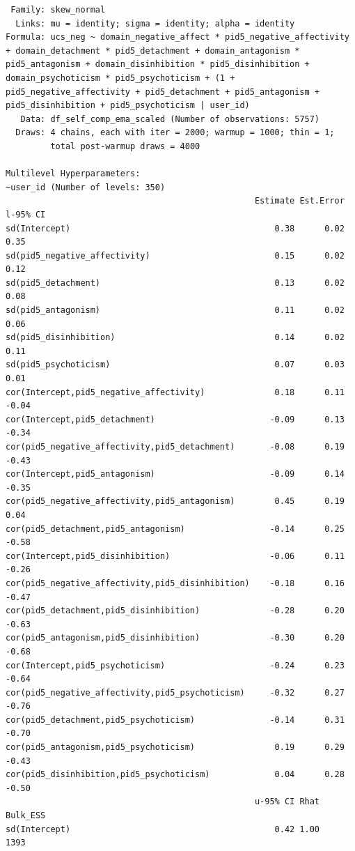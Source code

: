 \documentclass[
  11pt,
  a4paper,
  onecolumn]{article}
\begin{document}
\begin{verbatim}
 Family: skew_normal 
  Links: mu = identity; sigma = identity; alpha = identity 
Formula: ucs_neg ~ domain_negative_affect * pid5_negative_affectivity + domain_detachment * pid5_detachment + domain_antagonism * pid5_antagonism + domain_disinhibition * pid5_disinhibition + domain_psychoticism * pid5_psychoticism + (1 + pid5_negative_affectivity + pid5_detachment + pid5_antagonism + pid5_disinhibition + pid5_psychoticism | user_id) 
   Data: df_self_comp_ema_scaled (Number of observations: 5757) 
  Draws: 4 chains, each with iter = 2000; warmup = 1000; thin = 1;
         total post-warmup draws = 4000

Multilevel Hyperparameters:
~user_id (Number of levels: 350) 
                                                  Estimate Est.Error l-95% CI
sd(Intercept)                                         0.38      0.02     0.35
sd(pid5_negative_affectivity)                         0.15      0.02     0.12
sd(pid5_detachment)                                   0.13      0.02     0.08
sd(pid5_antagonism)                                   0.11      0.02     0.06
sd(pid5_disinhibition)                                0.14      0.02     0.11
sd(pid5_psychoticism)                                 0.07      0.03     0.01
cor(Intercept,pid5_negative_affectivity)              0.18      0.11    -0.04
cor(Intercept,pid5_detachment)                       -0.09      0.13    -0.34
cor(pid5_negative_affectivity,pid5_detachment)       -0.08      0.19    -0.43
cor(Intercept,pid5_antagonism)                       -0.09      0.14    -0.35
cor(pid5_negative_affectivity,pid5_antagonism)        0.45      0.19     0.04
cor(pid5_detachment,pid5_antagonism)                 -0.14      0.25    -0.58
cor(Intercept,pid5_disinhibition)                    -0.06      0.11    -0.26
cor(pid5_negative_affectivity,pid5_disinhibition)    -0.18      0.16    -0.47
cor(pid5_detachment,pid5_disinhibition)              -0.28      0.20    -0.63
cor(pid5_antagonism,pid5_disinhibition)              -0.30      0.20    -0.68
cor(Intercept,pid5_psychoticism)                     -0.24      0.23    -0.64
cor(pid5_negative_affectivity,pid5_psychoticism)     -0.32      0.27    -0.76
cor(pid5_detachment,pid5_psychoticism)               -0.14      0.31    -0.70
cor(pid5_antagonism,pid5_psychoticism)                0.19      0.29    -0.43
cor(pid5_disinhibition,pid5_psychoticism)             0.04      0.28    -0.50
                                                  u-95% CI Rhat Bulk_ESS
sd(Intercept)                                         0.42 1.00     1393

\end{verbatim}
\end{document}
